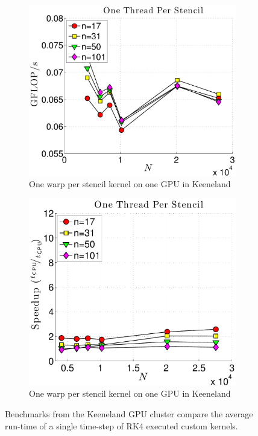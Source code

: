 \begin{figure}
\begin{subfigure}[t]{0.425\textwidth}
\includegraphics[width=1.0\textwidth]{../figures/keeneland_results/alltoallv/gflops_gpu_1proc_oneThreadPerStencil-eps-converted-to.pdf}
\caption{One warp per stencil kernel on one GPU in Keeneland}
\label{fig:gflops_gpu_1proc_oneThread_keeneland}
\end{subfigure}
\begin{subfigure}[t]{0.425\textwidth}
\includegraphics[width=1.0\textwidth]{../figures/keeneland_results/alltoallv/speedup_1proc_oneThreadPerStencil-eps-converted-to.pdf}
\caption{One warp per stencil kernel on one GPU in Keeneland}
\label{fig:speedup_1proc_oneThread_keeneland}
\end{subfigure} 
\caption{Benchmarks from the Keeneland GPU cluster compare the average run-time of a single time-step of RK4 executed custom kernels.}
\end{figure} 


